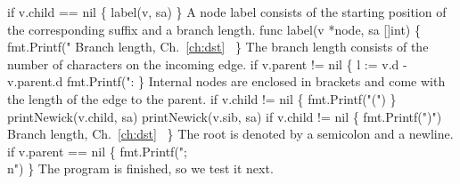 if v.child == nil \{
        label(v, sa)
\}
\nwendcode{}\nwdocspar
A node label consists of the starting position of the corresponding
suffix and a branch length.
\nwenddocs{}\plusendmoddef\nwstartdeflinemarkup{}\nwenddeflinemarkup
func label(v *node, sa []int) \{
          fmt.Printf("%
          \LA{}Branch length, Ch.~\ref{ch:dst}~{\nwtagstyle{}}\RA{}
\}
\nwendcode{}\nwdocspar
The branch length consists of the number of characters on the incoming
edge.
\nwenddocs{}\endmoddef\nwstartdeflinemarkup{}\nwenddeflinemarkup
if v.parent != nil \{
          l := v.d - v.parent.d
          fmt.Printf(":%
\}
\nwendcode{}\nwdocspar
Internal nodes are enclosed in brackets and come with the length of
the edge to the parent.
\nwenddocs{}\endmoddef\nwstartdeflinemarkup{}\nwenddeflinemarkup
if v.child != nil \{ fmt.Printf("(") \}
printNewick(v.child, sa)
printNewick(v.sib, sa)
if v.child != nil \{
          fmt.Printf(")")
          \LA{}Branch length, Ch.~\ref{ch:dst}~{\nwtagstyle{}}\RA{}
\}
\nwendcode{}\nwdocspar
The root is denoted by a semicolon and a newline.
\nwenddocs{}\endmoddef\nwstartdeflinemarkup{}\nwenddeflinemarkup
if v.parent == nil \{
          fmt.Printf(";\\n")
\}
\nwendcode{}\nwdocspar
The program  is finished, so we test it next.

